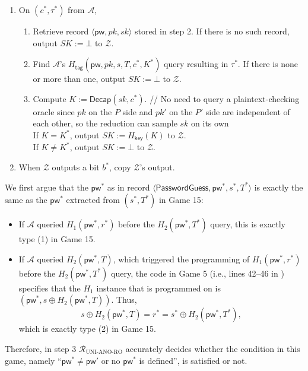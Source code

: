 \documentclass{article}
\theoremstyle{plain}
\theoremstyle{definition}
\theoremstyle{remark}
\newcommand{\adv}{\mathcal{A}}
\newcommand{\env}{\mathcal{Z}}
\newcommand{\red}{\mathcal{R}}
\newcommand{\Decap}{\mathsf{Decap}}
\newcommand{\Hkey}{H_\mathsf{key}}
\newcommand{\Htag}{H_\mathsf{tag}}
\newcommand{\pw}{\mathsf{pw}}
\begin{document}
\begin{enumerate}
\begin{enumerate}
        \item Output $SK'$ to $\env$, and send $(c,\tau')$ to $\adv$.
      \end{enumerate}
  \item On $(c^*,\tau^*)$ from $\adv$,
      \begin{enumerate}
        \item Retrieve record $\langle\pw,pk,sk\rangle$ stored in step 2. If there is no such record, output $SK := \bot$ to $\env$.
        \item Find $\adv$'s $\Htag(\pw,pk,s,T,c^*,K^*)$ query resulting in $\tau^*$. If there is none or more than one, output $SK := \bot$ to $\env$.
        \item Compute $K := \Decap(sk,c^*)$. \quad \textcolor[gray]{0.5}{// No need to query a plaintext-checking oracle since $pk$ on the $P$ side and $pk'$ on the $P'$ side are independent of each other, so the reduction can sample $sk$ on its own} \\
            If $K = K^*$, output $SK := \Hkey(K)$ to $\env$. \\
            If $K \neq K^*$, output $SK := \bot$ to $\env$.
      \end{enumerate}
  \item When $\env$ outputs a bit $b^*$, copy $\env$'s output.
\end{enumerate}

We first argue that the $\pw^*$ as in record $\langle\mathsf{PasswordGuess},\pw^*,s^*,T^*\rangle$ is exactly the same as the $\pw^*$ extracted from $(s^*,T^*)$ in Game 15:
\begin{itemize}
  \item If $\adv$ queried $H_1(\pw^*,r^*)$ before the $H_2(\pw^*,T^*)$ query, this is exactly type (1) in Game 15.
  \item If $\adv$ queried $H_2(\pw^*,T)$, which triggered the programming of $H_1(\pw^*,r^*)$ before the $H_2(\pw^*,T^*)$ query, the code in Game 5 (i.e., lines 42--46 in ) specifies that the $H_1$ instance that is programmed on is $(\pw^*, s \oplus H_2(\pw^*,T))$. Thus,
      \[
      s \oplus H_2(\pw^*,T) = r^* = s^* \oplus H_2(\pw^*,T^*),
      \]
      which is exactly type (2) in Game 15.
\end{itemize}
Therefore, in step 3 $\red_\text{UNI-ANO-RO}$ accurately decides whether the condition in this game, namely ``$\pw^* \neq \pw'$ or no $\pw^*$ is defined'', is satisfied or not.
\end{document}
